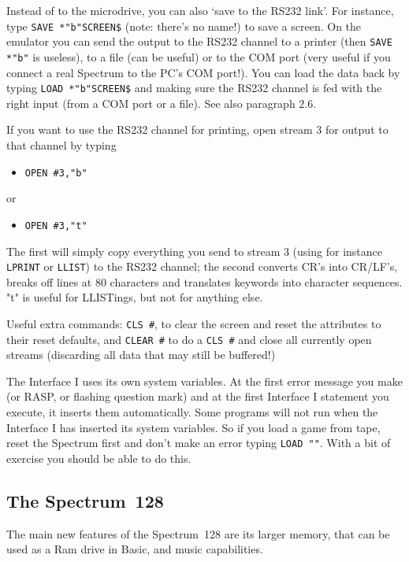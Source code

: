    Instead of to the microdrive, you can also `save to the RS232 link'. For
    instance, type \verb|SAVE *"b"SCREEN$| (note: there's no name!) to save a
    screen.  On the emulator you can send the output to the RS232 channel to
    a printer (then \verb|SAVE *"b"| is useless), to a file (can be useful)
    or to
    the COM port (very useful if you connect a real Spectrum to the PC's COM
    port!).  You can load the data back by typing \verb|LOAD *"b"SCREEN$| and
    making sure the RS232 channel is fed with the right input (from a COM
    port or a file).  See also paragraph 2.6.

    If you want to use the RS232 channel for printing, open stream 3 for
    output to that channel by typing
\begin{itemize}
  \item[] \verb|OPEN #3,"b"|
\end{itemize}
    or
\begin{itemize}
  \item[] \verb|OPEN #3,"t"|
\end{itemize}
    The first will simply copy everything you send to stream 3 (using for
    instance \verb|LPRINT| or \verb|LLIST|) to the RS232 channel; the
    second converts CR's
    into CR/LF's, breaks off lines at 80 characters and translates keywords
    into character sequences.  "t" is useful for LLISTings, but not for
    anything else.

    Useful extra commands: \verb|CLS #|, to clear the screen and reset the
    attributes to their reset defaults, and \verb|CLEAR #| to do a
    \verb|CLS #| and close
    all currently open streams (discarding all data that may still be
    buffered!)

    The Interface I uses its own system variables.  At the first error
    message you make (or RASP, or flashing question mark) and at the first
    Interface I statement you execute, it inserts them automatically.  Some
    programs will not run when the Interface I has inserted its system
    variables.  So if you load a game from tape, reset the Spectrum first
    and don't make an error typing \verb|LOAD ""|.  With a bit of exercise you
    should be able to do this.



\subsection{The Spectrum~128}

    The main new features of the Spectrum~128 are its larger memory, that
    can be used as a Ram drive in Basic, and music capabilities.

